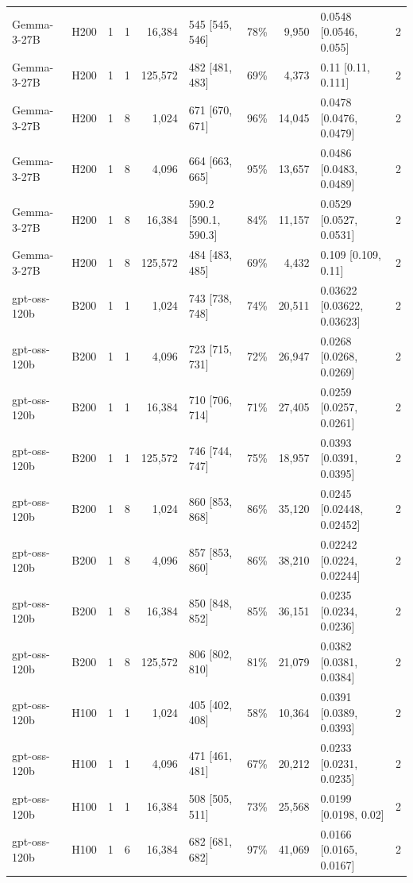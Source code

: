 \begin{landscape}
\begin{longtable}{llrrrlrrlr}
Gemma-3-27B & H200 & 1 & 1 & 16,384 & 545 {[}545, 546{]} & 78\% & 9,950 & 0.0548 {[}0.0546, 0.055{]} & 2 \\
Gemma-3-27B & H200 & 1 & 1 & 125,572 & 482 {[}481, 483{]} & 69\% & 4,373 & 0.11 {[}0.11, 0.111{]} & 2 \\
Gemma-3-27B & H200 & 1 & 8 & 1,024 & 671 {[}670, 671{]} & 96\% & 14,045 & 0.0478 {[}0.0476, 0.0479{]} & 2 \\
Gemma-3-27B & H200 & 1 & 8 & 4,096 & 664 {[}663, 665{]} & 95\% & 13,657 & 0.0486 {[}0.0483, 0.0489{]} & 2 \\
Gemma-3-27B & H200 & 1 & 8 & 16,384 & 590.2 {[}590.1, 590.3{]} & 84\% & 11,157 & 0.0529 {[}0.0527, 0.0531{]} & 2 \\
Gemma-3-27B & H200 & 1 & 8 & 125,572 & 484 {[}483, 485{]} & 69\% & 4,432 & 0.109 {[}0.109, 0.11{]} & 2 \\
gpt-oss-120b & B200 & 1 & 1 & 1,024 & 743 {[}738, 748{]} & 74\% & 20,511 & 0.03622 {[}0.03622, 0.03623{]} & 2 \\
gpt-oss-120b & B200 & 1 & 1 & 4,096 & 723 {[}715, 731{]} & 72\% & 26,947 & 0.0268 {[}0.0268, 0.0269{]} & 2 \\
gpt-oss-120b & B200 & 1 & 1 & 16,384 & 710 {[}706, 714{]} & 71\% & 27,405 & 0.0259 {[}0.0257, 0.0261{]} & 2 \\
gpt-oss-120b & B200 & 1 & 1 & 125,572 & 746 {[}744, 747{]} & 75\% & 18,957 & 0.0393 {[}0.0391, 0.0395{]} & 2 \\
gpt-oss-120b & B200 & 1 & 8 & 1,024 & 860 {[}853, 868{]} & 86\% & 35,120 & 0.0245 {[}0.02448, 0.02452{]} & 2 \\
gpt-oss-120b & B200 & 1 & 8 & 4,096 & 857 {[}853, 860{]} & 86\% & 38,210 & 0.02242 {[}0.0224, 0.02244{]} & 2 \\
gpt-oss-120b & B200 & 1 & 8 & 16,384 & 850 {[}848, 852{]} & 85\% & 36,151 & 0.0235 {[}0.0234, 0.0236{]} & 2 \\
gpt-oss-120b & B200 & 1 & 8 & 125,572 & 806 {[}802, 810{]} & 81\% & 21,079 & 0.0382 {[}0.0381, 0.0384{]} & 2 \\
gpt-oss-120b & H100 & 1 & 1 & 1,024 & 405 {[}402, 408{]} & 58\% & 10,364 & 0.0391 {[}0.0389, 0.0393{]} & 2 \\
gpt-oss-120b & H100 & 1 & 1 & 4,096 & 471 {[}461, 481{]} & 67\% & 20,212 & 0.0233 {[}0.0231, 0.0235{]} & 2 \\
gpt-oss-120b & H100 & 1 & 1 & 16,384 & 508 {[}505, 511{]} & 73\% & 25,568 & 0.0199 {[}0.0198, 0.02{]} & 2 \\
gpt-oss-120b & H100 & 1 & 6 & 16,384 & 682 {[}681, 682{]} & 97\% & 41,069 & 0.0166 {[}0.0165, 0.0167{]} & 2 \\

\end{longtable}
\end{landscape}
